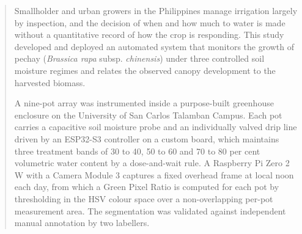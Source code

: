 %

\begin{abstract}
\setlength{\parindent}{0pt}
\setlength{\parskip}{\baselineskip}

Smallholder and urban growers in the Philippines manage irrigation largely by
inspection, and the decision of when and how much to water is made without a
quantitative record of how the crop is responding. This study developed and
deployed an automated system that monitors the growth of pechay
(\textit{Brassica rapa} subsp. \textit{chinensis}) under three controlled soil
moisture regimes and relates the observed canopy development to the harvested
biomass.

A nine-pot array was instrumented inside a purpose-built greenhouse enclosure
on the University of San Carlos Talamban Campus. Each pot carries a capacitive
soil moisture probe and an individually valved drip line driven by an ESP32-S3
controller on a custom board, which maintains three treatment bands of 30 to
40, 50 to 60 and 70 to 80 per cent volumetric water content by a
dose-and-wait rule. A Raspberry Pi Zero 2 W with a Camera Module 3 captures a
fixed overhead frame at local noon each day, from which a Green Pixel Ratio is
computed for each pot by thresholding in the HSV colour space over a
non-overlapping per-pot measurement area. The segmentation was validated
against independent manual annotation by two labellers.


\end{abstract}
